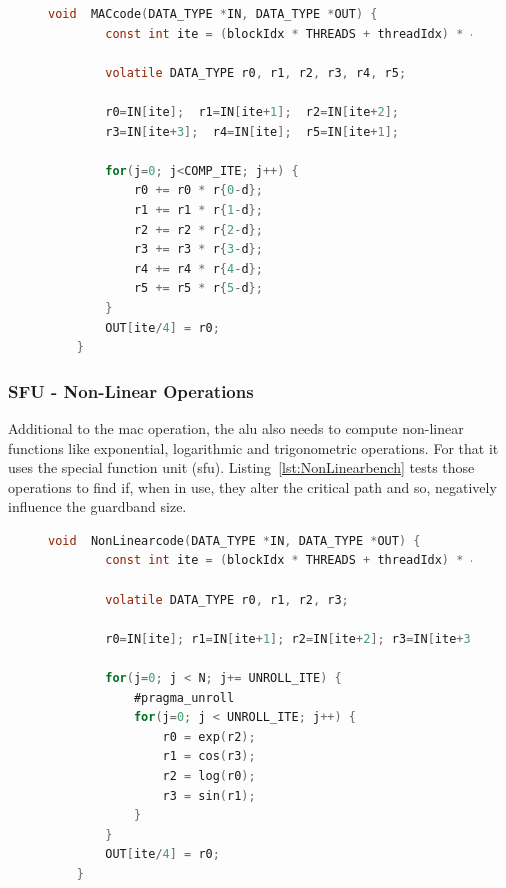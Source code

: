 \begin{figure}[htpb]
    \begin{lstlisting}[language=C, caption=MAC Benchmark Code, label=lst:MACbench, basicstyle=\footnotesize\ttfamily, abovecaptionskip=0pt, captionpos=b]
    void  MACcode(DATA_TYPE *IN, DATA_TYPE *OUT) {
        const int ite = (blockIdx * THREADS + threadIdx) * 4;
        
        volatile DATA_TYPE r0, r1, r2, r3, r4, r5;
        
        r0=IN[ite];  r1=IN[ite+1];  r2=IN[ite+2]; 
        r3=IN[ite+3];  r4=IN[ite];  r5=IN[ite+1];
        
        for(j=0; j<COMP_ITE; j++) {
            r0 += r0 * r{0-d};
            r1 += r1 * r{1-d}; 
            r2 += r2 * r{2-d};
            r3 += r3 * r{3-d}; 
            r4 += r4 * r{4-d};
            r5 += r5 * r{5-d};
        }
        OUT[ite/4] = r0;
    }
    \end{lstlisting}
\end{figure}


\subsubsection{SFU - Non-Linear Operations}
    
Additional to the \acrshort{mac} operation, the \acrshort{alu} also needs to compute non-linear functions like exponential, logarithmic and trigonometric operations. For that it uses the special function unit (\acrshort{sfu}). Listing~\ref{lst:NonLinearbench} tests those operations to find if, when in use, they alter the critical path and so, negatively influence the guardband size.
    
\begin{figure}[htpb]
    \begin{lstlisting}[language=C, caption=Non-linear Operations Benchmark Code, label=lst:NonLinearbench, basicstyle=\footnotesize\ttfamily, abovecaptionskip=0pt, captionpos=b]
    void  NonLinearcode(DATA_TYPE *IN, DATA_TYPE *OUT) {
        const int ite = (blockIdx * THREADS + threadIdx) * 4;
        
        volatile DATA_TYPE r0, r1, r2, r3;
        
        r0=IN[ite]; r1=IN[ite+1]; r2=IN[ite+2]; r3=IN[ite+3];  
        
        for(j=0; j < N; j+= UNROLL_ITE) {
            #pragma_unroll
            for(j=0; j < UNROLL_ITE; j++) {
                r0 = exp(r2);  
                r1 = cos(r3);
                r2 = log(r0);   
                r3 = sin(r1);
            }
        }
        OUT[ite/4] = r0;
    }
    \end{lstlisting}
\end{figure}

